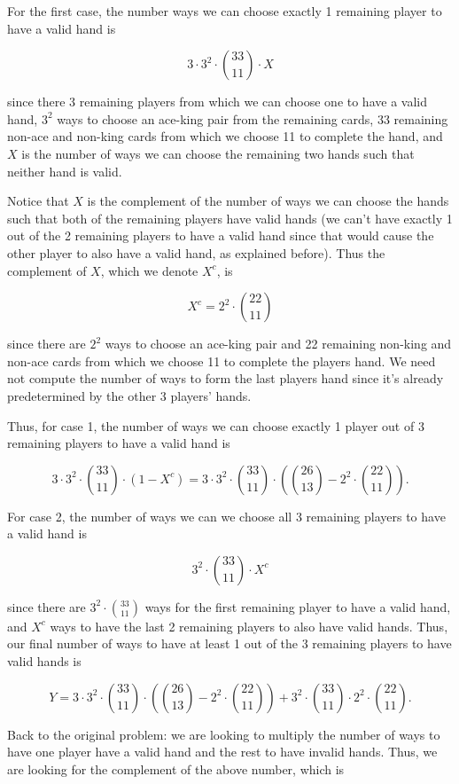 \documentclass[answers]{exam}
\begin{document}
\begin{questions}
\begin{parts}
\begin{solution}
For the first case, the number ways we can choose exactly 1 remaining player 
to have a valid hand is

\[
3 \cdot 3^2 \cdot \binom{33}{11} \cdot X
\] 

since there 3 remaining players from which we can choose one to have a valid
hand, $3^2$ ways to choose an ace-king pair from the remaining cards, 33 
remaining non-ace and non-king cards from which we choose 11 to complete the 
hand, and $X$ is the number of ways we can choose the remaining two hands 
such that neither hand is valid.

Notice that $X$ is the complement of the number of ways we can choose the
hands such that both of the remaining players have valid hands (we can't have
exactly 1 out of the 2 remaining players to have a valid hand since that would
cause the other player to also have a valid hand, as explained before). Thus
the complement of $X$, which we denote $X^{c}$, is

\[
X^{c} = 2^2 \cdot \binom{22}{11}
\] 

since there are $2^2$ ways to choose an ace-king pair and 22 remaining 
non-king and non-ace cards from which we choose 11 to complete the players 
hand. We need not compute the number of ways to form the last players hand 
since it's already predetermined by the other 3 players' hands.

Thus, for case 1, the number of ways we can choose exactly 1 player out of 3 
remaining players to have a valid hand is

\[
3 \cdot 3^2 \cdot \binom{33}{11} \cdot (1 - X^{c}) = 3 \cdot 3^2 \cdot \binom{33}{11} \cdot \left( \binom{26}{13} - 2^2 \cdot \binom{22}{11} \right) 
.\] 

For case 2, the number of ways we can we choose all 3 remaining players to have
a valid hand is 

\[
3^2 \cdot \binom{33}{11} \cdot X^{c}
\] 

since there are $3^2 \cdot \binom{33}{11}$ ways for the first remaining player 
to have a valid hand, and $X^{c}$ ways to have the last 2 remaining players to 
also have valid hands. Thus, our final number of ways to have at least 1 out of
the 3 remaining players to have valid hands is

\[
Y = 3 \cdot 3^2 \cdot \binom{33}{11} \cdot \left( \binom{26}{13} - 2^2 \cdot \binom{22}{11} \right) + 3^2 \cdot \binom{33}{11} \cdot 2^2 \cdot \binom{22}{11}
.\] 

Back to the original problem: we are looking to multiply the number of ways to
have one player have a valid hand and the rest to have invalid hands. Thus, we
are looking for the complement of the above number, which is 


\end{solution}
\end{parts}
\end{questions}
\end{document}
